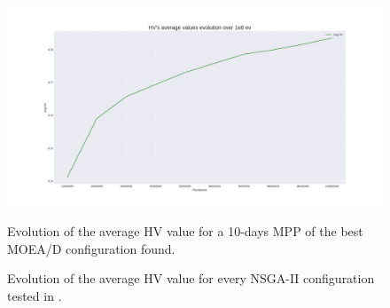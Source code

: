 \begin{figure}[H]
\centering
\includegraphics[scale=0.35]{../experiments/plots/avgHV_evolution_10_days.png}
\caption{Evolution of the average HV value for a 10-days MPP of the best MOEA/D configuration found.}
\caption{Evolution of the average HV value for every NSGA-II configuration tested in \cite{Miranda2018}.}
\label{fig:avg}
\end{figure}

